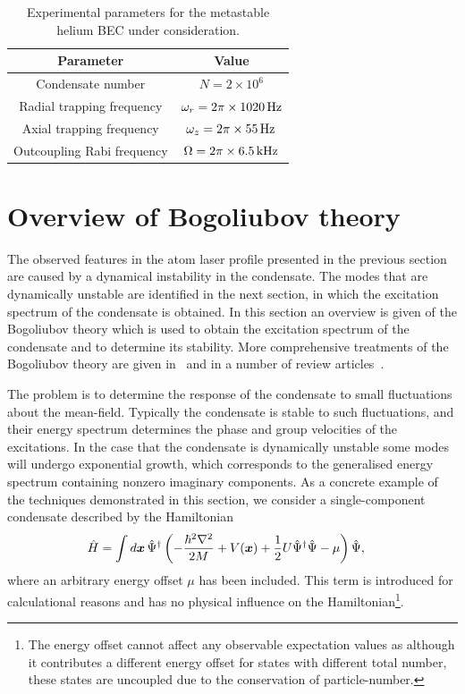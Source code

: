\begin{table}
    \centering
    \begin{tabular}{cc}
    \toprule
    Parameter & Value\\
    \midrule
    Condensate number & $N = 2\times 10^6$\\
    Radial trapping frequency & $\omega_r = 2 \pi \times \unit[1020]{Hz}$\\
    Axial trapping frequency & $\omega_z = 2\pi \times \unit[55]{Hz}$\\
    Outcoupling Rabi frequency & $\Omega = 2\pi \times \unit[6.5]{kHz}$\\
    \bottomrule
    \end{tabular}
    \caption{Experimental parameters for the metastable helium BEC under consideration.}
    \label{Peaks:ExperimentalParameters}
\end{table}

\section{Overview of Bogoliubov theory}
\label{Peaks:ElementaryExcitations}

The observed features in the atom laser profile presented in the previous section are caused by a dynamical instability in the condensate. The modes that are dynamically unstable are identified in the next section, in which the excitation spectrum of the condensate is obtained. In this section an overview is given of the Bogoliubov theory which is used to obtain the excitation spectrum of the condensate and to determine its stability. More comprehensive treatments of the Bogoliubov theory are given in~\citep{PethickSmith} and in a number of review articles~\citep{Leggett:2001,Ozeri:2005,Proukakis:2008}.

The problem is to determine the response of the condensate to small fluctuations about the mean-field. Typically the condensate is stable to such fluctuations, and their energy spectrum determines the phase and group velocities of the excitations.  In the case that the condensate is dynamically unstable some modes will undergo exponential growth, which corresponds to the generalised energy spectrum containing nonzero imaginary components. As a concrete example of the techniques demonstrated in this section, we consider a single-component condensate described by the Hamiltonian
\begin{align}
    \label{Peaks:ElementaryExcitationsExampleHamiltonian}
    \hat{H} &= \int d \vect{x}\, \hat{\Psi}^\dagger \left( -\frac{\hbar^2 \nabla^2}{2 M} + V(\vect{x}) + \frac{1}{2} U \hat{\Psi}^\dagger \hat{\Psi} - \mu \right) \hat{\Psi},
\end{align}
where an arbitrary energy offset $\mu$ has been included. This term is introduced for calculational reasons and has no physical influence on the Hamiltonian\footnote{The energy offset cannot affect any observable expectation values as although it contributes a different energy offset for states with different total number, these states are uncoupled due to the conservation of particle-number.}.

